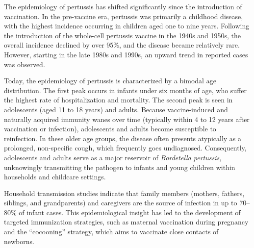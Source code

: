 The epidemiology of pertussis has shifted significantly since the introduction of vaccination. In the pre-vaccine era, pertussis was primarily a childhood disease, with the highest incidence occurring in children aged one to nine years. Following the introduction of the whole-cell pertussis vaccine in the 1940s and 1950s, the overall incidence declined by over 95\%, and the disease became relatively rare. However, starting in the late 1980s and 1990s, an upward trend in reported cases was observed.

Today, the epidemiology of pertussis is characterized by a bimodal age distribution. The first peak occurs in infants under six months of age, who suffer the highest rate of hospitalization and mortality. The second peak is seen in adolescents (aged 11 to 18 years) and adults. Because vaccine-induced and naturally acquired immunity wanes over time (typically within 4 to 12 years after vaccination or infection), adolescents and adults become susceptible to reinfection. In these older age groups, the disease often presents atypically as a prolonged, non-specific cough, which frequently goes undiagnosed. Consequently, adolescents and adults serve as a major reservoir of \textit{Bordetella pertussis}, unknowingly transmitting the pathogen to infants and young children within households and childcare settings.

Household transmission studies indicate that family members (mothers, fathers, siblings, and grandparents) and caregivers are the source of infection in up to 70--80\% of infant cases. This epidemiological insight has led to the development of targeted immunization strategies, such as maternal vaccination during pregnancy and the ``cocooning'' strategy, which aims to vaccinate close contacts of newborns.

